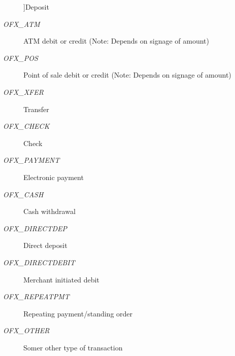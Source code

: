\begin{Desc}
\begin{description}
{}]Deposit \item[{\em 
OFX\_\-ATM\label{import_8c_a735cf9b89f806f2be4c52117c5057173a64b99c67932f371b0793f91786dfcbce}
}]ATM debit or credit (Note: Depends on signage of amount) \item[{\em 
OFX\_\-POS\label{import_8c_a735cf9b89f806f2be4c52117c5057173a15566db98285da8aa8c4f3b7b9fabc6e}
}]Point of sale debit or credit (Note: Depends on signage of amount) \item[{\em 
OFX\_\-XFER\label{import_8c_a735cf9b89f806f2be4c52117c5057173a0cacbc14384739342490f0ee8662e4b6}
}]Transfer \item[{\em 
OFX\_\-CHECK\label{import_8c_a735cf9b89f806f2be4c52117c5057173a791ae71426db867d29e0ce41fe8f4d02}
}]Check \item[{\em 
OFX\_\-PAYMENT\label{import_8c_a735cf9b89f806f2be4c52117c5057173a44e13043cd858cc10e0d298c21373ce3}
}]Electronic payment \item[{\em 
OFX\_\-CASH\label{import_8c_a735cf9b89f806f2be4c52117c5057173a4bef7088f38bcefd900bacc7956f969a}
}]Cash withdrawal \item[{\em 
OFX\_\-DIRECTDEP\label{import_8c_a735cf9b89f806f2be4c52117c5057173a1eec1a02b6945ca4ab70e79c617b97ed}
}]Direct deposit \item[{\em 
OFX\_\-DIRECTDEBIT\label{import_8c_a735cf9b89f806f2be4c52117c5057173ac66a49bd7d3e0e14a88c2ea30941efef}
}]Merchant initiated debit \item[{\em 
OFX\_\-REPEATPMT\label{import_8c_a735cf9b89f806f2be4c52117c5057173af2b3f6d44dd25fd77be05880ec2a4edf}
}]Repeating payment/standing order \item[{\em 
OFX\_\-OTHER\label{import_8c_a735cf9b89f806f2be4c52117c5057173a67e1508a2089ea04720e582036f45101}
}]Somer other type of transaction \end{description}
\end{Desc}



